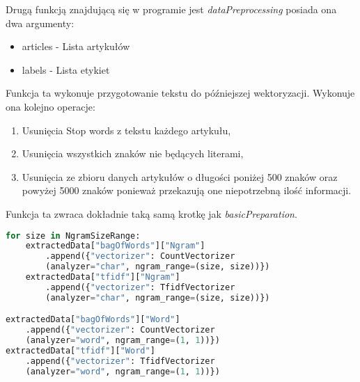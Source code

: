 Drugą funkcją znajdującą się w programie jest \textit{dataPreprocessing} posiada 
ona dwa argumenty:
\begin{itemize}
    \item articles - Lista artykułów
    \item labels - Lista etykiet
\end{itemize}
Funkcja ta wykonuje przygotowanie tekstu do późniejszej wektoryzacji. Wykonuje ona 
kolejno operacje:
\begin{enumerate}
    \item Usunięcia Stop words z tekstu każdego artykułu,
    \item Usunięcia wszystkich znaków nie będących literami,
    \item Usunięcia ze zbioru danych artykułów o długości poniżej 500 znaków oraz powyżej 5000 znaków 
    ponieważ przekazują one niepotrzebną ilość informacji.
\end{enumerate}
Funkcja ta zwraca dokładnie taką samą krotkę jak \textit{basicPreparation}.
\begin{lstlisting}[language=Python, caption={Tworzenie wektoryzatorów dzielących tekst na różnej długości ngramy}, captionpos=b, frame=single]
for size in NgramSizeRange:
    extractedData["bagOfWords"]["Ngram"]
        .append({"vectorizer": CountVectorizer
        (analyzer="char", ngram_range=(size, size))})
    extractedData["tfidf"]["Ngram"]
        .append({"vectorizer": TfidfVectorizer
        (analyzer="char", ngram_range=(size, size))})

extractedData["bagOfWords"]["Word"]
    .append({"vectorizer": CountVectorizer
    (analyzer="word", ngram_range=(1, 1))})
extractedData["tfidf"]["Word"]
    .append({"vectorizer": TfidfVectorizer
    (analyzer="word", ngram_range=(1, 1))})

\end{lstlisting}
